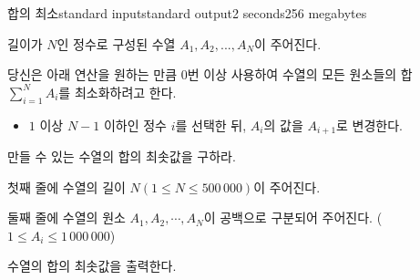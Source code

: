 \begin{problem}{합의 최소}{standard input}{standard output}{2 seconds}{256 megabytes}

길이가 $N$인 정수로 구성된 수열 $A_1, A_2, ..., A_N$이 주어진다.

당신은 아래 연산을 원하는 만큼 0번 이상 사용하여 수열의 모든 원소들의 합 $\sum_{i=1}^N A_i$를 최소화하려고 한다.

\begin{itemize}
  \item $1$ 이상 $N-1$ 이하인 정수 $i$를 선택한 뒤, $A_i$의 값을 $A_{i+1}$로 변경한다.
\end{itemize}

만들 수 있는 수열의 합의 최솟값을 구하라.

\InputFile
첫째 줄에 수열의 길이 $N(1 \leq N \leq 500\,000)$이 주어진다.

둘째 줄에 수열의 원소 $A_1, A_2, \cdots, A_N$이 공백으로 구분되어 주어진다. ($1 \le A_i \le 1\,000\,000$)

\OutputFile
수열의 합의 최솟값을 출력한다.

\Examples

\begin{example}
%
%
\end{example}

\end{problem}

